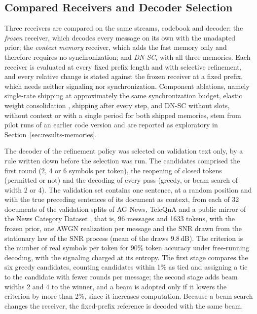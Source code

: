 \subsection{Compared Receivers and Decoder Selection}
\label{sec:setup-receivers}

Three receivers are compared on the same streams, codebook and decoder: the \emph{frozen} receiver, which decodes every message on its own with the unadapted prior; the \emph{context memory} receiver, which adds the fast memory only and therefore requires no synchronization; and \emph{DN-SC}, with all three memories. Each receiver is evaluated at every fixed prefix length and with selective refinement, and every relative change is stated against the frozen receiver at a fixed prefix, which needs neither signaling nor synchronization. Component ablations, namely single-rate shipping at approximately the same synchronization budget, elastic weight consolidation \cite{kirkpatrick2017}, shipping after every step, and DN-SC without slots, without context or with a single period for both shipped memories, stem from pilot runs of an earlier code version and are reported as exploratory in Section~\ref{sec:results-memories}.

The decoder of the refinement policy was selected on validation text only, by a rule written down before the selection was run. The candidates comprised the first round (2, 4 or 6 symbols per token), the reopening of closed tokens (permitted or not) and the decoding of every pass (greedy, or beam search of width 2 or 4). The validation set contains one sentence, at a random position and with the true preceding sentences of its document as context, from each of 32 documents of the validation splits of AG News, TeleQnA and a public mirror of the News Category Dataset \cite{misra2022}, that is, 96 messages and 1633 tokens, with the frozen prior, one AWGN realization per message and the SNR drawn from the stationary law of the SNR process (mean of the draws 9.8\,dB). The criterion is the number of real symbols per token for 90\% token accuracy under free-running decoding, with the signaling charged at its entropy. The first stage compares the six greedy candidates, counting candidates within 1\% as tied and assigning a tie to the candidate with fewer rounds per message; the second stage adds beam widths 2 and 4 to the winner, and a beam is adopted only if it lowers the criterion by more than 2\%, since it increases computation. Because a beam search changes the receiver, the fixed-prefix reference is decoded with the same beam.

